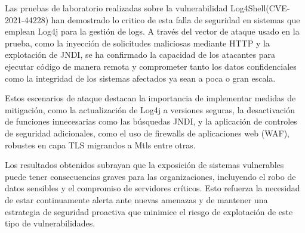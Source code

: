 \documentclass[stu, 11pt, letterpaper, donotrepeattitle, floatsintext, natbib]{apa7}
\begin{document}
Las pruebas de laboratorio realizadas sobre la vulnerabilidad Log4Shell(CVE-2021-44228) han demostrado lo critico de esta falla de seguridad en sistemas que emplean Log4j para la gestión de logs. A través del vector de ataque usado en la prueba, como la inyección de solicitudes maliciosas mediante HTTP y la explotación de JNDI, se ha confirmado la capacidad de los atacantes para ejecutar código de manera remota y comprometer tanto los datos confidenciales como la integridad de los sistemas afectados ya sean a poca o gran escala.

Estos escenarios de ataque destacan la importancia de implementar medidas de mitigación, como la actualización de Log4j a versiones seguras, la desactivación de funciones innecesarias como las búsquedas JNDI, y la aplicación de controles de seguridad adicionales, como el uso de firewalls de aplicaciones web (WAF), robustes en capa TLS migrandos a Mtls entre otras.

Los resultados obtenidos subrayan que la exposición de sistemas vulnerables puede tener consecuencias graves para las organizaciones, incluyendo el robo de datos sensibles y el compromiso de servidores críticos. Esto refuerza la necesidad de estar continuamente alerta ante nuevas amenazas y de mantener una estrategia de seguridad proactiva que minimice el riesgo de explotación de este tipo de vulnerabilidades.




\newpage
\renewcommand\refname{\large\textbf{Referencias}}

\end{document}
